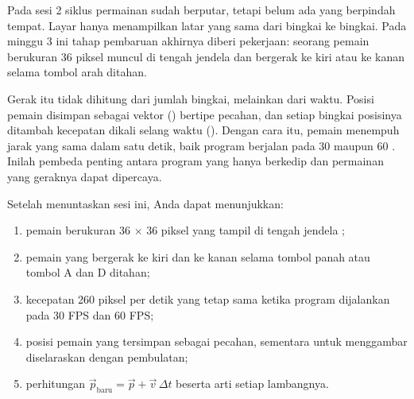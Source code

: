 

Pada sesi 2 siklus permainan sudah berputar, tetapi belum ada yang berpindah
tempat. Layar hanya menampilkan latar yang sama dari bingkai ke bingkai. Pada
minggu 3 ini tahap pembaruan akhirnya diberi pekerjaan: seorang pemain
berukuran 36 piksel muncul di tengah jendela dan bergerak ke kiri atau ke kanan
selama tombol arah ditahan.

Gerak itu tidak dihitung dari jumlah bingkai, melainkan dari waktu. Posisi
pemain disimpan sebagai vektor () bertipe pecahan, dan setiap
bingkai posisinya ditambah kecepatan dikali selang waktu (). Dengan cara itu, pemain menempuh jarak yang sama dalam satu detik, baik
program berjalan pada 30 maupun 60 . Inilah pembeda penting antara
program yang hanya berkedip dan permainan yang geraknya dapat dipercaya.


\begin{tujuanbox}
Setelah menuntaskan sesi ini, Anda dapat menunjukkan:
\begin{enumerate}[leftmargin=1.5em, itemsep=0.2em]
  \item pemain berukuran 36 $\times$ 36 piksel yang tampil di tengah jendela
        \NamaPermainan;
  \item pemain yang bergerak ke kiri dan ke kanan selama tombol panah atau
        tombol A dan D ditahan;
  \item kecepatan 260 piksel per detik yang tetap sama ketika program
        dijalankan pada 30 FPS dan 60 FPS;
  \item posisi pemain yang tersimpan sebagai pecahan, sementara
         untuk menggambar diselaraskan dengan pembulatan;
  \item perhitungan $\vec{p}_{\text{baru}} = \vec{p} + \vec{v}\,\Delta t$
        beserta arti setiap lambangnya.
\end{enumerate}
\end{tujuanbox}


